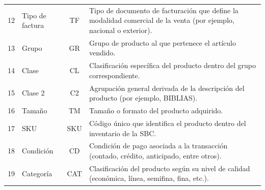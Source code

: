 \begin{table}[H]
\begin{tabular}{c l c p{6.2cm}}
12 & Tipo de factura      
   & TF
   & Tipo de documento de facturación que define la modalidad comercial de la venta (por ejemplo, nacional o exterior). \\

13 & Grupo                
   & GR
   & Grupo de producto al que pertenece el artículo vendido. \\

14 & Clase                
   & CL
   & Clasificación específica del producto dentro del grupo correspondiente. \\

15 & Clase 2              
   & C2
   & Agrupación general derivada de la descripción del producto (por ejemplo, BIBLIAS). \\

16 & Tamaño               
   & TM
   & Tamaño o formato del producto adquirido. \\

17 & SKU                  
   & SKU
   & Código único que identifica el producto dentro del inventario de la SBC. \\

18 & Condición            
   & CD
   & Condición de pago asociada a la transacción (contado, crédito, anticipado, entre otros). \\

19 & Categoría            
   & CAT
   & Clasificación del producto según su nivel de calidad (económica, línea, semifina, fina, etc.). \\

\hline
\end{tabular}
\end{table}
